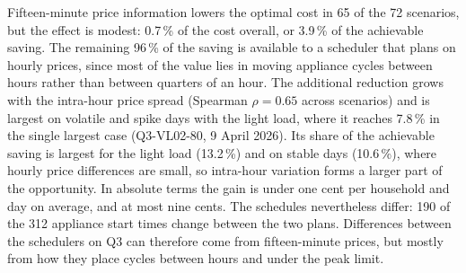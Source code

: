 \documentclass[12pt,a4paper]{report}
\begin{document}


Fifteen-minute price information lowers the optimal cost in 65 of the 72
scenarios, but the effect is modest: 0.7\,\% of the cost overall, or
3.9\,\% of the achievable saving. The remaining 96\,\% of the saving is
available to a scheduler that plans on hourly prices, since most of the
value lies in moving appliance cycles between hours rather than between
quarters of an hour. The additional reduction grows with the intra-hour
price spread (Spearman $\rho = 0.65$ across scenarios) and is largest on
volatile and spike days with the light load, where it reaches 7.8\,\%
in the single largest case (Q3-VL02-80, 9 April 2026). Its share of the
achievable saving is largest for the light load (13.2\,\%) and on stable
days (10.6\,\%), where hourly price differences are small, so intra-hour
variation forms a larger part of the opportunity. In absolute terms the
gain is under one cent per household and day on average, and at most
nine cents. The schedules nevertheless differ: 190 of the 312 appliance
start times change between the two plans. Differences between the
schedulers on Q3 can therefore come from fifteen-minute prices, but
mostly from how they place cycles between hours and under the peak
limit.
\end{document}
